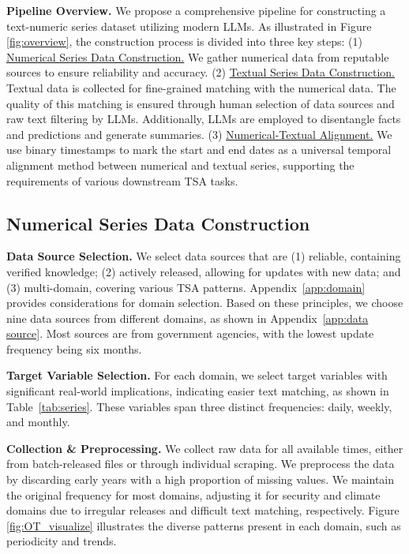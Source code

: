 \par \noindent \textbf{Pipeline Overview.} We propose a comprehensive pipeline for constructing a text-numeric series dataset utilizing modern LLMs. As illustrated in Figure \ref{fig:overview}, the construction process is divided into three key steps: (1) \underline{Numerical Series Data Construction.} We gather numerical data from reputable sources to ensure reliability and accuracy. (2) \underline{Textual Series Data Construction.} Textual data is collected for fine-grained matching with the numerical data. The quality of this matching is ensured through human selection of data sources and raw text filtering by LLMs. Additionally, LLMs are employed to disentangle facts and predictions and generate summaries. (3) \underline{Numerical-Textual Alignment.} We use binary timestamps to mark the start and end dates as a universal temporal alignment method between numerical and textual series, supporting the requirements of various downstream TSA tasks.



\subsection{Numerical Series Data Construction}
\par \noindent \textbf{Data Source Selection.} We select data sources that are (1) reliable, containing verified knowledge; (2) actively released, allowing for updates with new data; and (3) multi-domain, covering various TSA patterns. Appendix~\ref{app:domain} provides considerations for domain selection. Based on these principles, we choose nine data sources from different domains, as shown in Appendix~\ref{app:data source}. Most sources are from government agencies, with the lowest update frequency being six months. 

\par \noindent \textbf{Target Variable Selection.} For each domain, we select target variables with significant real-world implications, indicating easier text matching, as shown in Table~\ref{tab:series}. These variables span three distinct frequencies: daily, weekly, and monthly. 

\par \noindent \textbf{Collection \& Preprocessing.} We collect raw data for all available times, either from batch-released files or through individual scraping. We preprocess the data by discarding early years with a high proportion of missing values. We maintain the original frequency for most domains, adjusting it for security and climate domains due to irregular releases and difficult text matching, respectively. Figure \ref{fig:OT_visualize} illustrates the diverse patterns present in each domain, such as periodicity and trends.

